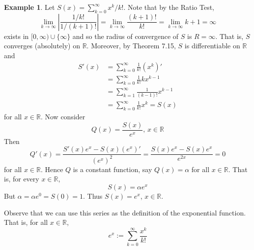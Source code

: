 \documentclass[11pt]{article}
\theoremstyle{definition}
\newtheorem{exmp}[thm]{Example}
\newcommand{\mbR}{\ensuremath{\mathbb{R}}}
\begin{document}
\begin{exmp}
Let $S(x) = \sum_{k=0}^\infty x^k / k!$. Note that by the Ratio Test,
$$\lim_{k\to\infty} \left| \frac{1/k!}{1/(k+1)!} \right| = \lim_{k\to\infty} \frac{(k+1)!}{k!} = \lim_{k\to\infty} k+1 = \infty$$
exists in $[0, \infty) \cup \{\infty\}$ and so the radius of convergence of $S$ is $R = \infty$. That is, $S$ converges (absolutely) on $\mbR$. Moreover, by Theorem 7.15, $S$ is differentiable on $\mbR$ and
\begin{align*}
S'(x) & = \sum_{k=0}^\infty \frac{1}{k!} (x^k)' \\
& = \sum_{k=0}^\infty \frac{1}{k!} kx^{k-1} \\
& = \sum_{k=1}^\infty \frac{1}{(k-1)!} x^{k-1} \\
& = \sum_{k=0}^\infty \frac{1}{k!} x^k = S(x)
\end{align*}
for all $x \in \mbR$. Now consider
$$Q(x) = \frac{S(x)}{e^x}, \, x \in \mbR$$
Then
$$Q'(x) = \frac{S'(x)e^x - S(x)(e^x)'}{(e^x)^2} = \frac{S(x)e^x - S(x)e^x}{e^{2x}} = 0$$
for all $x \in \mbR$. Hence $Q$ is a constant function, say $Q(x) = \alpha$ for all $x \in \mbR$. That is, for every $x \in \mbR$,
$$S(x) = \alpha e^x$$
But $\alpha = \alpha e^0 = S(0) = 1$. Thus $S(x) = e^x$, $x \in \mbR$.

Observe that we can use this series as the definition of the exponential function. That is, for all $x \in \mbR$,
$$e^x := \sum_{k=0}^\infty \frac{x^k}{k!}$$
\end{exmp}
\end{document}
